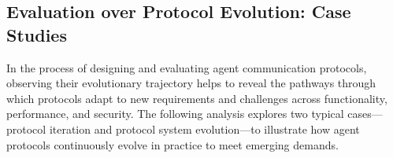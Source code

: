 \documentclass[10pt,preprint]{article}
\begin{document}

\subsection{Evaluation over Protocol Evolution: Case Studies}

In the process of designing and evaluating agent communication protocols, observing their evolutionary trajectory helps to reveal the pathways through which protocols adapt to new requirements and challenges across functionality, performance, and security. The following analysis explores two typical cases—protocol iteration and protocol system evolution—to illustrate how agent protocols continuously evolve in practice to meet emerging demands.
\end{document}
